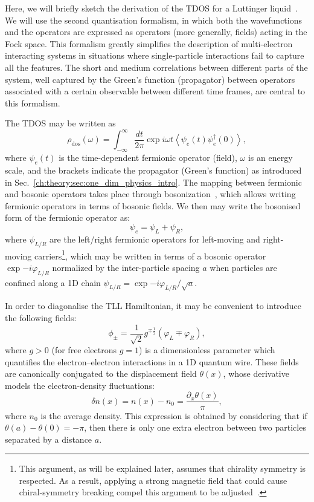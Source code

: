 Here, we will briefly sketch the derivation of the \gls{TDOS} for a Luttinger liquid~\cite{egger1997effective, egger1999luttinger, kane1997coulomb}. We will use the second quantisation formalism, in which both the wavefunctions and the operators are expressed as operators (more generally, fields) acting in the Fock space. This formalism greatly simplifies the description of multi-electron interacting systems in situations where single-particle interactions fail to capture all the features. The short and medium correlations between different parts of the system, well captured by the Green's function (propagator) between operators associated with a certain observable between different time frames, are central to this formalism.

The \gls{TDOS} may be written as
%
\begin{equation}
    \rho_{\operatorname{dos}}(\omega)=\int_{-\infty}^{\infty} \frac{d t}{2 \pi} \exp{i \omega t}\left\langle\psi_{e}(t) \psi_{e}^\dagger(0)\right\rangle,
\end{equation}
%
where $\psi_{e}(t)$ is the time-dependent fermionic operator (field), $\omega$ is an energy scale, and the brackets indicate the propagator (Green's function) as introduced in Sec.~\ref{ch:theory:sec:one_dim_physics_intro}. The mapping between fermionic and bosonic operators takes place through bosonization~\cite{von1998bosonization}, which allows writing fermionic operators in terms of bosonic fields.
We then may write the bosonised form of the fermionic operator as:
%
\begin{equation}
    \psi_{e} = \psi_{L}+\psi_{R},
\end{equation}
%
where $\psi_{L/R}$ are the left/right fermionic operators for left-moving and right-moving carriers\footnote[1]{This argument, as will be explained later, assumes that chirality symmetry is respected. As a result, applying a strong magnetic field that could cause chiral-symmetry breaking compel this argument to be adjusted~\cite{roy2014chiral}.}, which may be written in terms of a bosonic operator $\exp{-i \varphi_{L/R}}$ normalized by the inter-particle spacing $a$ when particles are confined along a 1D chain
$\psi_{L / R}=\exp{-i \varphi_{L / R}}/\sqrt{a}.$

In order to diagonalise the \gls{TLL} Hamiltonian, it may be convenient to introduce the following fields:
\begin{equation}
    \phi_{\pm}=\frac{1}{\sqrt{2}} g^{\mp\frac{1}{2}}\left(\varphi_{L} \mp \varphi_{R}\right),
\end{equation}
%
where $g>0$ (for free electrons $g=1$) is a dimensionless parameter which quantifies the electron--electron interactions in a 1D quantum wire. These fields are canonically conjugated to the displacement field $\theta(x)$, whose derivative models the electron-density fluctuations:
%
\begin{equation}
    \delta n(x) = n(x) - n_0 = \frac{\partial_x \theta(x)}{\pi},
\end{equation}
%
where $n_0$ is the average density. This expression is obtained by considering that if $\theta(a)- \theta(0)= -\pi$, then there is only one extra electron between two particles separated by a distance $a$.

